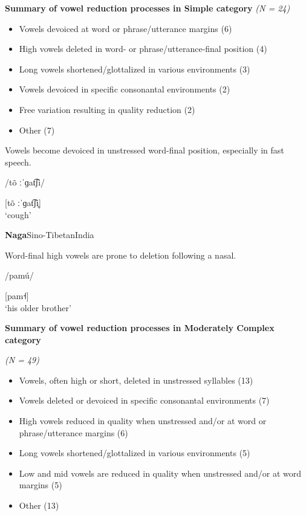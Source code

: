 \ea\label{ex:6.16}
  \textbf{Summary of vowel reduction processes in Simple category} \textit{(N = 24)}

\begin{itemize}
\item Vowels devoiced at word or phrase/utterance margins {(6)}
\item High vowels deleted in word- or phrase/utterance-final position {(4)}
\item Long vowels shortened/glottalized in various environments {(3)}
\item Vowels devoiced in specific consonantal environments {(2)}
\item Free variation resulting in quality reduction {(2)}
\item Other {(7)}
\end{itemize}

\ea{}

Vowels become devoiced in unstressed word-final position, especially in fast speech.

/tõ ːˈɡat͡ʃi/

[tõ ːˈɡat͡ʃi̥]\\
\glt ‘cough’
\citep[60-1]{Facundes2000}

\ex{} \textbf{Naga}{Sino-Tibetan}{India}

Word-final high vowels are prone to deletion following a nasal.

/pamú/

[pam˧]\\
\glt ‘his older brother’
\citep[369]{Teo2012}
\z
\z

\ea\label{ex:6.17}
  \textbf{Summary of vowel reduction processes in Moderately Complex category} 

\textit{(N = 49)}

\begin{itemize}
\item Vowels, often high or short, deleted in unstressed syllables (13)
\item Vowels deleted or devoiced in specific consonantal environments (7)
\item High vowels reduced in quality when unstressed and/or at word or phrase/utterance margins (6)
\item Long vowels shortened/glottalized in various environments (5)
\item Low and mid vowels are reduced in quality when unstressed and/or at word margins (5)
\item Other {(13)}
\end{itemize}


